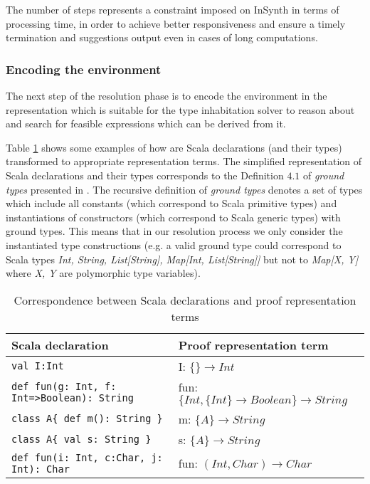 The number of steps represents a constraint imposed on InSynth in terms of processing time, in order to achieve better responsiveness and ensure a timely termination and suggestions output even in cases of long computations. 

\subsubsection{Encoding the environment}
\label{subsubsec:encoding_the_environment}

The next step of the resolution phase is to encode the environment in the representation which is suitable for the type inhabitation solver to reason about and search for feasible expressions which can be derived from it.

Table \ref{tab:correspondence} shows some examples of how are Scala declarations (and their types) transformed to appropriate representation terms.
The simplified representation of Scala declarations and their types corresponds to the Definition $4.1$ of \textit{ground types} presented in \cite{EPFL-REPORT-170040}.
The recursive definition of \textit{ground types} denotes a set of types which include all constants (which correspond to Scala primitive types) and instantiations of constructors (which correspond to Scala generic types) with ground types.
This means that in our resolution process we only consider the instantiated type constructions (e.g. a valid ground type could correspond to Scala types \textit{Int, String, List[String], Map[Int, List[String]]} but not to \textit{Map[X, Y]} where \textit{X, Y} are polymorphic type variables).  

\begin{table}[!ht]
\caption{Correspondence between Scala declarations and proof representation terms}
\centering
{\small
\begin{tabular}{|p{}|p{}|}
\hline
\textbf{Scala declaration} & \textbf{Proof representation term} \\
\hline
\texttt{val I:Int} & I: $\{\} \rightarrow Int$ \\
\hline
\texttt{def fun(g: Int, f: Int=>Boolean): String} & fun:
$\{ Int, \{ Int \} \rightarrow Boolean \} \rightarrow String$ \\
\hline
\texttt{class A\{ def m(): String \}} & m: $\{A\} \rightarrow String$ \\
\hline
\texttt{class A\{ val s: String \}} & s: $\{A\} \rightarrow String$ \\
\hline
\texttt{def fun(i: Int, c:Char, j: Int): Char} & fun: $(Int, Char) \rightarrow Char$ \\
\hline
\end{tabular}
}
\label{tab:correspondence}
\end{table} 

